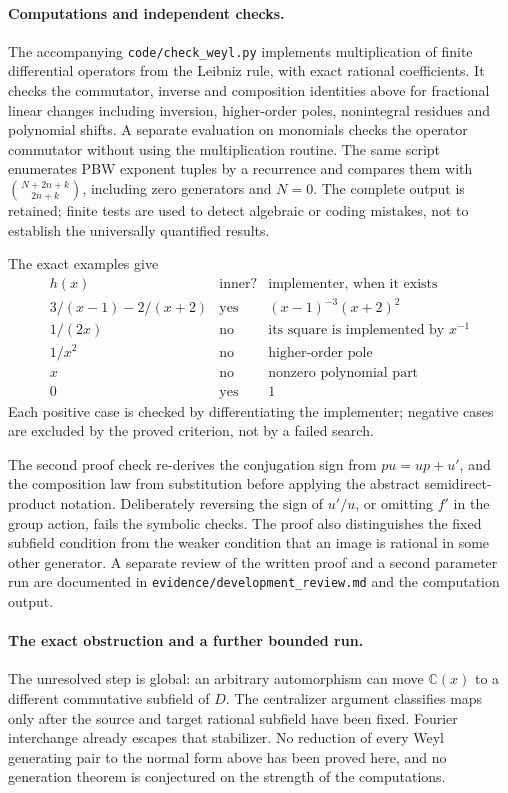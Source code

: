 \paragraph{Computations and independent checks.}
The accompanying \texttt{code/check\_weyl.py} implements multiplication of
finite differential operators from the Leibniz rule, with exact rational
coefficients. It checks the commutator, inverse and composition identities
above for fractional linear changes including inversion, higher-order poles,
nonintegral residues and polynomial shifts. A separate evaluation on
monomials checks the operator commutator without using the multiplication
routine. The same script enumerates PBW exponent tuples by a recurrence and
compares them with \(\binom{N+2n+k}{2n+k}\), including zero generators and
\(N=0\). The complete output is retained; finite tests are used to detect
algebraic or coding mistakes, not to establish the universally quantified
results.

\begin{example}
The exact examples give
\[
\begin{array}{c|c|c}
h(x)&\text{inner?}&\text{implementer, when it exists}\\\hline
3/(x-1)-2/(x+2)&\text{yes}&(x-1)^{-3}(x+2)^2\\
1/(2x)&\text{no}&\text{its square is implemented by }x^{-1}\\
1/x^2&\text{no}&\text{higher-order pole}\\
x&\text{no}&\text{nonzero polynomial part}\\
0&\text{yes}&1
\end{array}
\]
Each positive case is checked by differentiating the implementer; negative
cases are excluded by the proved criterion, not by a failed search.
\end{example}

The second proof check re-derives the conjugation sign from
\(pu=up+u'\), and the composition law from substitution before applying the
abstract semidirect-product notation. Deliberately reversing the sign of
\(u'/u\), or omitting \(f'\) in the group action, fails the symbolic checks.
The proof also distinguishes the fixed subfield condition from the weaker
condition that an image is rational in some other generator. A separate
review of the written proof and a second parameter run are documented in
\texttt{evidence/development\_review.md} and the computation output.

\paragraph{The exact obstruction and a further bounded run.}
The unresolved step is global: an arbitrary automorphism can move
\(\mathbb C(x)\) to a different commutative subfield of \(D\). The
centralizer argument classifies maps only after the source and target
rational subfield have been fixed. Fourier interchange already escapes that
stabilizer. No reduction of every Weyl generating pair to the normal form
above has been proved here, and no generation theorem is conjectured on the
strength of the computations.

